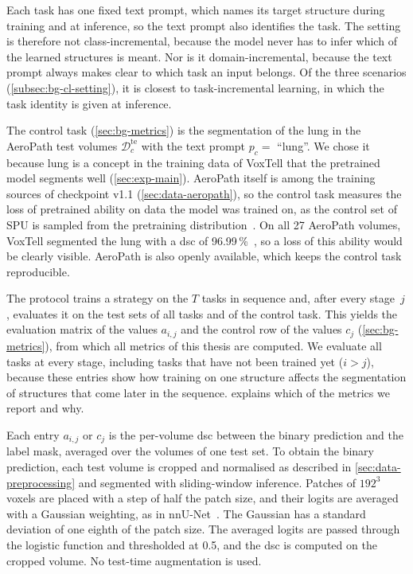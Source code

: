 Each task has one fixed text prompt, which names its target structure during training and at inference, so the text prompt also identifies the task.
The setting is therefore not class-incremental, because the model never has to infer which of the learned structures is meant.
Nor is it domain-incremental, because the text prompt always makes clear to which task an input belongs.
Of the three scenarios (\cref{subsec:bg-cl-setting}), it is closest to task-incremental learning, in which the task identity is given at inference.

The control task (\cref{sec:bg-metrics}) is the segmentation of the lung in the AeroPath test volumes $\mathcal{D}_c^{\mathrm{te}}$ with the text prompt $p_c = $ ``lung''.
We chose it because lung is a concept in the training data of VoxTell that the pretrained model segments well (\cref{sec:exp-main}).
AeroPath itself is among the training sources of checkpoint v1.1 (\cref{sec:data-aeropath}), so the control task measures the loss of pretrained ability on data the model was trained on, as the control set of SPU is sampled from the pretraining distribution~\cite[Sec.~3]{Zhang_2024_CVPR}.
On all 27 AeroPath volumes, VoxTell segmented the lung with a \gls{dsc} of 96.99\,\%~\cite[Suppl.~Table~7]{rokuss2025voxtellfreetextpromptableuniversal}, so a loss of this ability would be clearly visible.
AeroPath is also openly available, which keeps the control task reproducible.

The protocol trains a strategy on the $T$ tasks in sequence and, after every stage~$j$, evaluates it on the test sets of all tasks and of the control task.
This yields the evaluation matrix of the values $a_{i,j}$ and the control row of the values $c_j$ (\cref{sec:bg-metrics}), from which all metrics of this thesis are computed.
We evaluate all tasks at every stage, including tasks that have not been trained yet ($i > j$), because these entries show how training on one structure affects the segmentation of structures that come later in the sequence.
 explains which of the metrics we report and why.

Each entry $a_{i,j}$ or $c_j$ is the per-volume \gls{dsc} between the binary prediction and the label mask, averaged over the volumes of one test set.
To obtain the binary prediction, each test volume is cropped and normalised as described in \cref{sec:data-preprocessing} and segmented with sliding-window inference.
Patches of $192^3$ voxels are placed with a step of half the patch size, and their logits are averaged with a Gaussian weighting, as in nnU-Net~\cite{isensee2018nnunetselfadaptingframeworkunetbased}.
The Gaussian has a standard deviation of one eighth of the patch size.
The averaged logits are passed through the logistic function and thresholded at 0.5, and the \gls{dsc} is computed on the cropped volume.
No test-time augmentation is used.

